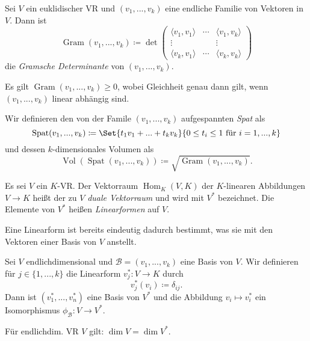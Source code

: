 \documentclass{cheat-sheet}
\DeclareMathOperator{\Gram}{Gram}
\DeclareMathOperator{\Spat}{Spat}
\DeclareMathOperator{\Vol}{Vol}
\DeclareMathOperator{\Hom}{Hom}
\newcommand{\BB}{\mathcal{B}}
\begin{document}
\begin{defn}
  Sei $V$ ein euklidischer VR und $(v_1, ..., v_k)$ eine endliche Familie von Vektoren in $V$. Dann ist
  \[ \Gram(v_1, ..., v_k) \coloneqq \det \begin{pmatrix}
  \langle v_1 , v_1 \rangle & \cdots & \langle v_1 , v_k \rangle \\
  \vdots & & \vdots \\
  \langle v_k , v_1 \rangle & \cdots & \langle v_k , v_k \rangle
  \end{pmatrix} \]
  die \emph{Gramsche Determinante} von $(v_1, ..., v_k)$.
\end{defn}

\begin{satz}
  Es gilt $\Gram(v_1, ..., v_k) \ge 0$, wobei Gleichheit genau dann gilt, wenn $(v_1, ..., v_k)$ linear abhängig sind.
\end{satz}

\begin{defn}
  Wir definieren den von der Famile $(v_1, ..., v_k)$ aufgespannten \emph{Spat} als
  \[ \Spat(v_1, ..., v_k) \coloneqq \Set{ t_1 v_1 + ... + t_k v_k }{ 0 \le t_i \le 1 \text{ für } i = 1, ..., k } \]
  und dessen $k$-dimensionales Volumen als
  \[ \Vol(\Spat(v_1, ..., v_k)) \coloneqq \sqrt{ \Gram(v_1, ..., v_k) }. \]
\end{defn}

\begin{defn}
  Es sei $V$ ein $K$-VR. Der Vektorraum $\Hom_K(V, K)$ der $K$-linearen Abbildungen $V \to K$ heißt der zu $V$ \emph{duale Vektorraum} und wird mit $V^*$ bezeichnet. Die Elemente von $V^*$ heißen \emph{Linearformen} auf $V$.
\end{defn}

\begin{bem}
  Eine Linearform ist bereits eindeutig dadurch bestimmt, was sie mit den Vektoren einer Basis von $V$ anstellt.
\end{bem}

\begin{satz}
  Sei $V$ endlichdimensional und $\BB = (v_1, ..., v_k)$ eine Basis von $V$. Wir definieren für $j \in \{ 1, ..., k \}$ die Linearform $v_j^* : V \to K$ durch
  \[ v_j^*(v_i) \coloneqq \delta_{ij}. \]
  Dann ist $(v_1^*, ..., v_n^*)$ eine Basis von $V^*$ und die Abbildung $v_i \mapsto v_i^*$ ein Isomorphismus $\phi_{\BB} : V \to V^*$.
\end{satz}

\begin{kor}
  Für endlichdim. VR $V$ gilt: $\dim V = \dim V^*$.
\end{kor}
\end{document}
